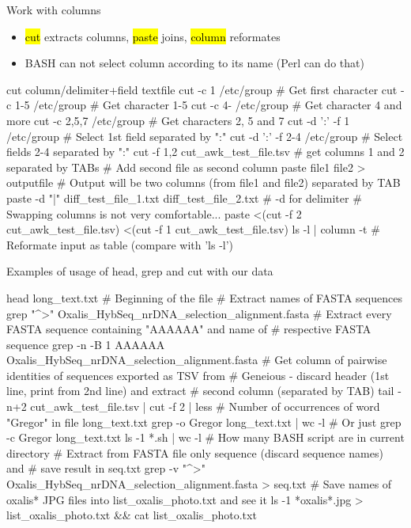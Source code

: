 \documentclass[compress, ucs, xelatex, 11pt, xcolor=svgnames, aspectratio=169,
	hyperref={
		bookmarks=true,
		unicode=true,
		colorlinks=true,
		pdftitle={Linux, command line and MetaCentrum},
		plainpages=false,
		pdfauthor={Vojtech Zeisek},
		pdfsubject={Course about use of Linux command line, writing shell scripts and using MetaCentrum of CESNET},
		pdfcreator={XeLaTeX},
		pdfkeywords={Linux, GNU, BASH, shell, command line, MetaCentrum},
		linkcolor=DarkRed, %
		anchorcolor=DarkBlue, %
		citecolor=Indigo, %
		filecolor=NavyBlue, %
		menucolor=DarkMagenta, %
		urlcolor=DarkBlue, %
		pdftex},
	url={hyphens, lowtilde} %
	]{beamer}
\renewcommand{\texttt}[1]{\hl{\ttfamily #1}}
\begin{document}
\begin{frame}[fragile]{Work with columns}
	\label{cutpaste}
	\begin{itemize}
		\item \texttt{cut} extracts columns, \texttt{paste} joins, \texttt{column} reformates
		\item BASH can not select column according to its name (Perl can do that)
	\end{itemize}
	\vfill
	\begin{bashcode}
    cut column/delimiter+field textfile
    cut -c 1 /etc/group # Get first character
    cut -c 1-5 /etc/group # Get character 1-5
    cut -c 4- /etc/group # Get character 4 and more
    cut -c 2,5,7 /etc/group # Get characters 2, 5 and 7
    cut -d ':' -f 1 /etc/group # Select 1st field separated by ":"
    cut -d ':' -f 2-4 /etc/group # Select fields 2-4 separated by ":"
    cut -f 1,2 cut_awk_test_file.tsv # get columns 1 and 2 separated by TABs
    # Add second file as second column
    paste file1 file2 > outputfile
    # Output will be two columns (from file1 and file2) separated by TAB
    paste -d "|" diff_test_file_1.txt diff_test_file_2.txt # -d for delimiter
    # Swapping columns is not very comfortable...
    paste <(cut -f 2 cut_awk_test_file.tsv) <(cut -f 1 cut_awk_test_file.tsv)
    ls -l | column -t # Reformate input as table (compare with 'ls -l')
	\end{bashcode}
\end{frame}

\begin{frame}[fragile]{Examples of usage of head, grep and cut with our data}
	\begin{bashcode}
    head long_text.txt # Beginning of the file
    # Extract names of FASTA sequences
    grep "^>" Oxalis_HybSeq_nrDNA_selection_alignment.fasta
    # Extract every FASTA sequence containing "AAAAAA" and name of
    # respective FASTA sequence
    grep -n -B 1 AAAAAA Oxalis_HybSeq_nrDNA_selection_alignment.fasta
    # Get column of pairwise identities of sequences exported as TSV from
    # Geneious - discard header (1st line, print from 2nd line) and extract
    # second column (separated by TAB)
    tail -n+2 cut_awk_test_file.tsv | cut -f 2 | less
    # Number of occurrences of word "Gregor" in file long_text.txt
    grep -o Gregor long_text.txt | wc -l # Or just
    grep -c Gregor long_text.txt
    ls -1 *.sh | wc -l # How many BASH script are in current directory
    # Extract from FASTA file only sequence (discard sequence names) and
    # save result in seq.txt
    grep -v "^>" Oxalis_HybSeq_nrDNA_selection_alignment.fasta > seq.txt
    # Save names of oxalis* JPG files into list_oxalis_photo.txt and see it
    ls -1 *oxalis*.jpg > list_oxalis_photo.txt && cat list_oxalis_photo.txt
	\end{bashcode}
\end{frame}
\end{document}
